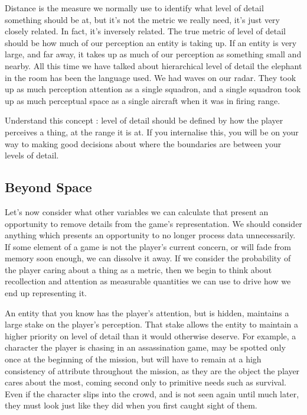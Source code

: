 \documentclass[a4paper,12pt]{article}
\begin{document}
Distance is the measure we normally use to identify what level of detail something should be at, but it's not the metric we really need, it's just very closely related.
In fact, it's inversely related.
The true metric of level of detail should be how much of our perception an entity is taking up.
If an entity is very large, and far away, it takes up as much of our perception as something small and nearby.
All this time we have talked about hierarchical level of detail the elephant in the room has been the language used.
We had waves on our radar.
They took up as much perception attention as a single squadron, and a single squadron took up as much perceptual space as a single aircraft when it was in firing range.

Understand this concept :
level of detail should be defined by how the player perceives a thing, at the range it is at.
If you internalise this, you will be on your way to making good decisions about where the boundaries are between your levels of detail.

\subsection{Beyond Space}

Let's now consider what other variables we can calculate that present an opportunity to remove details from the game's representation.
We should consider anything which presents an opportunity to no longer process data unnecessarily.
If some element of a game is not the player's current concern, or will fade from memory soon enough, we can dissolve it away.
If we consider the probability of the player caring about a thing as a metric, then we begin to think about recollection and attention as measurable quantities we can use to drive how we end up representing it.

An entity that you know has the player's attention, but is hidden, maintains a large stake on the player's perception.
That stake allows the entity to maintain a higher priority on level of detail than it would otherwise deserve.
For example, a character the player is chasing in an assassination game, may be spotted only once at the beginning of the mission, but will have to remain at a high consistency of attribute throughout the mission, as they are the object the player cares about the most, coming second only to primitive needs such as survival.
Even if the character slips into the crowd, and is not seen again until much later, they must look just like they did when you first caught sight of them.
\end{document}
